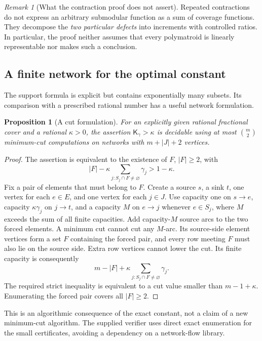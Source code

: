 \documentclass[11pt]{article}
\newtheorem{proposition}[theorem]{Proposition}
\theoremstyle{definition}
\theoremstyle{remark}
\newtheorem{remark}[theorem]{Remark}
\newcommand{\1}{\mathbf 1}
\newcommand{\Kopt}{\mathsf K}
\begin{document}
\begin{remark}[What the contraction proof does not assert]
Repeated contractions do not express an arbitrary submodular function as a sum
of coverage functions. They decompose the \emph{two particular defects} into
increments with controlled ratios. In particular, the proof neither assumes
that every polymatroid is linearly representable nor makes such a conclusion.
\end{remark}

\subsection{A finite network for the optimal constant}

The support formula is explicit but contains exponentially many subsets. Its
comparison with a prescribed rational number has a useful network formulation.

\begin{proposition}[A cut formulation]
\label{prop:cut}
For an explicitly given rational fractional cover and a rational $\kappa>0$,
the assertion $\Kopt_\gamma>\kappa$ is decidable using at most
$\binom{m}{2}$ minimum-cut computations on networks with $m+|J|+2$ vertices.
\end{proposition}

\begin{proof}
The assertion is equivalent to the existence of $F$, $|F|\ge2$, with
\[
 |F|-\kappa\sum_{j:S_j\cap F\ne\varnothing}\gamma_j>1-\kappa.
\]
Fix a pair of elements that must belong to $F$. Create a source $s$, a sink
$t$, one vertex for each $e\in E$, and one vertex for each $j\in J$.
Use capacity one on $s\to e$, capacity $\kappa\gamma_j$ on $j\to t$, and a
capacity $M$ on $e\to j$ whenever $e\in S_j$, where $M$ exceeds the sum of all
finite capacities. Add capacity-$M$ source arcs to the two forced elements.
A minimum cut cannot cut any $M$-arc. Its source-side element vertices form a
set $F$ containing the forced pair, and every row meeting $F$ must also lie on
the source side. Extra row vertices cannot lower the cut. Its finite capacity
is consequently
\[
 m-|F|+\kappa\sum_{j:S_j\cap F\ne\varnothing}\gamma_j.
\]
The required strict inequality is equivalent to a cut value smaller than
$m-1+\kappa$. Enumerating the forced pair covers all $|F|\ge2$.
\end{proof}

This is an algorithmic consequence of the exact constant, not a claim of a new
minimum-cut algorithm. The supplied verifier uses direct exact enumeration for
the small certificates, avoiding a dependency on a network-flow library.
\end{document}
